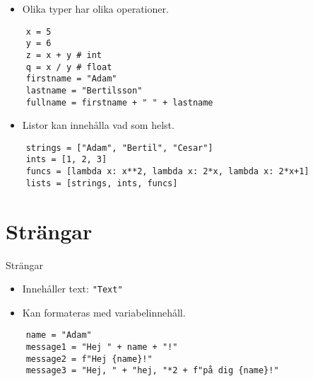 \begin{frame}[fragile]
  \begin{remark}
    \begin{itemize}
      \item Olika typer har olika operationer.
    \end{itemize}
  \end{remark}

  \begin{verbatim}
    x = 5
    y = 6
    z = x + y # int
    q = x / y # float
    firstname = "Adam"
    lastname = "Bertilsson"
    fullname = firstname + " " + lastname
  \end{verbatim}
\end{frame}

\begin{frame}[fragile]
  \begin{remark}
    \begin{itemize}
      \item Listor kan innehålla vad som helst.
    \end{itemize}
  \end{remark}

  \begin{verbatim}
    strings = ["Adam", "Bertil", "Cesar"]
    ints = [1, 2, 3]
    funcs = [lambda x: x**2, lambda x: 2*x, lambda x: 2*x+1]
    lists = [strings, ints, funcs]
  \end{verbatim}
\end{frame}


\section{Strängar}

\begin{frame}[fragile]
  \begin{block}{Strängar}
    \begin{itemize}
      \item Innehåller text: \texttt{"Text"}
      \item Kan formateras med variabelinnehåll.
    \end{itemize}
  \end{block}

  \begin{verbatim}
    name = "Adam"
    message1 = "Hej " + name + "!"
    message2 = f"Hej {name}!"
    message3 = "Hej, " + "hej, "*2 + f"på dig {name}!"
  \end{verbatim}
\end{frame}

